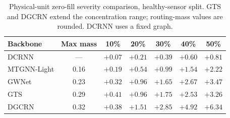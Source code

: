 \begin{table}[h]
\centering\small
\caption{Physical-unit zero-fill severity comparison, healthy-sensor split. GTS and DGCRN extend the concentration range; routing-mass values are rounded. DCRNN uses a fixed graph.}
\label{tab:severity_extended}
\begin{tabular}{lcccccc}
\toprule
\textbf{Backbone} & \textbf{Max mass} & \textbf{10\%} & \textbf{20\%} & \textbf{30\%} & \textbf{40\%} & \textbf{50\%} \\
\midrule
DCRNN & --- & $+0.07$ & $+0.21$ & $+0.39$ & $+0.60$ & $+0.81$ \\
MTGNN-Light & 0.16 & $+0.19$ & $+0.54$ & $+0.99$ & $+1.54$ & $+2.22$ \\
GWNet & 0.23 & $+0.32$ & $+0.96$ & $+1.65$ & $+2.67$ & $+3.47$ \\
GTS & 0.29 & $+0.41$ & $+0.96$ & $+1.75$ & $+2.53$ & $+3.26$ \\
DGCRN & 0.32 & $+0.38$ & $+1.51$ & $+2.85$ & $+4.92$ & $+6.34$ \\
\bottomrule
\end{tabular}
\end{table}
